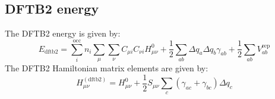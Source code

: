 \documentclass{article}
\numberwithin{equation}{section}
\begin{document}
\subsection{DFTB2 energy}
The DFTB2 energy is given by:\cite{dftb2}
\begin{equation}
    E_\mathrm{dftb2} = \sum_i^\mathrm{occ} n_i  \sum_\mu \sum_\nu C_{\mu i}  C_{\nu i} H^0_{\mu\nu} + \frac{1}{2} \sum_{ab} \Delta q_a \Delta q_b \gamma_{ab}+ \frac{1}{2} \sum_{ab} V^\mathrm{rep}_{ab} %
\end{equation}
The DFTB2 Hamiltonian matrix elements are given by:\cite{dftb2}
\begin{equation}
    H_{\mu\nu}^{\mathrm{(dftb2)}} = H^0_{\mu\nu} + \frac{1}{2}S_{\mu\nu} \sum_c \left( \gamma_{ac} + \gamma_{bc} \right)\Delta q_c 
\end{equation}
\end{document}
